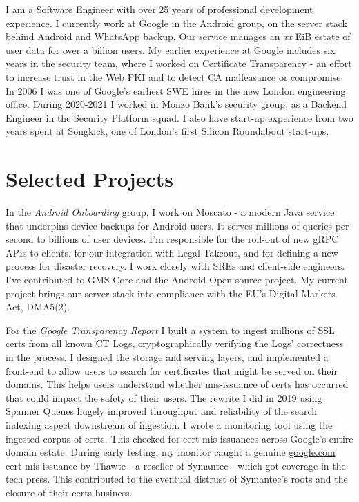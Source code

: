\documentclass[line]{resume}
\begin{document}
\begin{resume}
    I am a Software Engineer with over 25 years of professional development experience.  I currently work at Google in
    the Android group, on the server stack behind Android and WhatsApp backup.  Our service manages an \textsl{xx} EiB estate of
    user data for over a billion users. My earlier experience at Google includes six years in the security team, where
    I worked on Certificate Transparency - an effort to increase trust in the Web PKI and to detect CA malfeasance or
    compromise.  In 2006 I was one of Google's earliest SWE hires in the new London engineering office.
    During 2020-2021 I worked in Monzo Bank's security group, as a Backend Engineer in the Security Platform squad.  I
    also have start-up experience from two years spent at Songkick, one of London's first Silicon Roundabout start-ups.

    \section{\mysidestyle Selected Projects}

    In the \textsl{Android Onboarding} group, I work on Moscato - a modern Java service that underpins device backups
    for Android users. It serves millions of queries-per-second to billions of user devices. I'm responsible for the
    roll-out of new gRPC APIs to clients, for our integration with Legal Takeout, and for defining a new process for
    disaster recovery.  I work closely with SREs and client-side engineers.  I've contributed to GMS Core and the
    Android Open-source project.  My current project brings our server stack into compliance with the EU's Digital
    Markets Act, DMA5(2).

    For the \textsl{Google Transparency Report} I built a system to ingest millions of SSL certs from all known CT Logs,
    cryptographically verifying the Logs' correctness in the process.  I designed the storage and serving layers, and
    implemented a front-end to allow users to search for certificates that might be served on their domains.  This
    helps users understand whether mis-issuance of certs has occurred that could impact the safety of their users. The
    rewrite I did in 2019 using Spanner Queues hugely improved throughput and reliability of the search indexing aspect
    downstream of ingestion.  I wrote a monitoring tool using the ingested corpus of certs.  This checked for cert
    mis-issuances across Google's entire domain estate.  During early testing, my monitor caught a genuine
    \url{google.com} cert mis-issuance by Thawte - a reseller of Symantec - which got coverage in the tech press.  This
    contributed to the eventual distrust of Symantec's roots and the closure of their certs business.


\end{resume}
\end{document}
